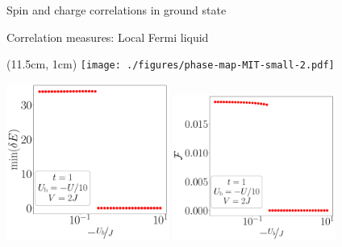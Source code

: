 \documentclass[aspectratio=169]{beamer}
\begin{document}
\begin{frame}[noframenumbering]{Spin and charge correlations in ground state}

\end{frame}

\begin{frame}[noframenumbering]{Correlation measures: Local Fermi liquid}

\begin{textblock*}{0.3\textwidth}(11.5cm, 1cm)
	\texttt{[image: ./figures/phase-map-MIT-small-2.pdf]}
\end{textblock*}

\includegraphics[width=0.4\textwidth]{./figures/gap-t=1.000,J=10.000,0.000,40,V=3J,Ubath=-U_by_10,N=4,U=1.000,1000.000,40.pdf}
\includegraphics[width=0.4\textwidth]{./figures/lfl-t=1.000,J=10.000,0.000,40,V=3J,Ubath=-U_by_10,N=4,U=1.000,1000.000,40.pdf}
\end{frame}
\end{document}
